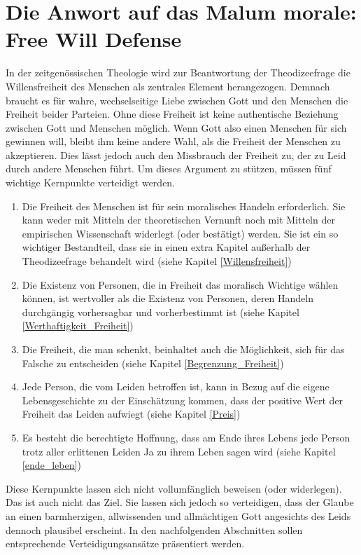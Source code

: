 \section{Die Anwort auf das Malum morale: Free Will Defense} \label{free_will_defense}
In der zeitgenössischen Theologie wird zur Beantwortung der Theodizeefrage die Willensfreiheit des Menschen als zentrales Element herangezogen. Demnach braucht es für wahre, wechselseitige Liebe zwischen Gott und den Menschen die Freiheit beider Parteien. Ohne diese Freiheit ist keine authentische Beziehung zwischen Gott und Menschen möglich. Wenn Gott also einen Menschen für sich gewinnen will, bleibt ihm keine andere Wahl, als die Freiheit der Menschen zu akzeptieren. Dies lässt jedoch auch den Missbrauch der Freiheit zu, der zu Leid durch andere Menschen führt. Um dieses Argument zu stützen, müssen fünf wichtige Kernpunkte verteidigt werden.
\begin{enumerate}
	\item Die Freiheit des Menschen ist für sein moralisches Handeln erforderlich. Sie kann weder mit Mitteln der theoretischen Vernunft noch mit Mitteln der empirischen Wissenschaft widerlegt (oder bestätigt) werden. Sie ist ein so wichtiger Bestandteil, dass sie in einen extra Kapitel außerhalb der Theodizeefrage behandelt wird (siehe Kapitel \ref{Willensfreiheit})
	\item Die Existenz von Personen, die in Freiheit das moralisch Wichtige wählen können, ist wertvoller als die Existenz von Personen, deren Handeln durchgängig vorhersagbar und vorherbestimmt ist (siehe Kapitel \ref{Werthaftigkeit_Freiheit})
	\item Die Freiheit, die man schenkt, beinhaltet auch die Möglichkeit, sich für das Falsche zu entscheiden (siehe Kapitel \ref{Begrenzung_Freiheit})
	\item Jede Person, die vom Leiden betroffen ist, kann in Bezug auf die eigene Lebensgeschichte zu der Einschätzung kommen, dass der positive Wert der Freiheit das Leiden aufwiegt (siehe Kapitel \ref{Preis})
	\item Es besteht die berechtigte Hoffnung, dass am Ende ihres Lebens jede Person trotz aller erlittenen Leiden Ja zu ihrem Leben sagen wird (siehe Kapitel \ref{ende_leben})
\end{enumerate}

Diese Kernpunkte lassen sich nicht vollumfänglich beweisen (oder widerlegen). Das ist auch nicht das Ziel. Sie lassen sich jedoch so verteidigen, dass der Glaube an einen barmherzigen, allwissenden und allmächtigen Gott angesichts des Leids dennoch plausibel erscheint. In den nachfolgenden Abschnitten sollen entsprechende Verteidigungsansätze präsentiert werden.



